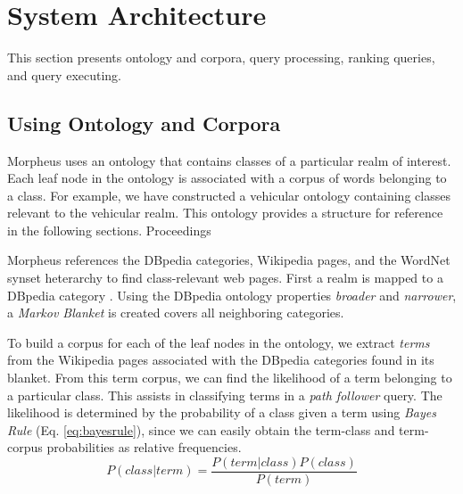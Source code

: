 \section{System Architecture}
\label{sec:systemarch}

This section presents ontology and corpora, query processing, ranking queries, and query executing.

\subsection{Using Ontology and Corpora} 
\label{sec:ontology_corpora}

Morpheus uses an ontology that contains classes of a particular realm of interest. Each leaf node in the ontology is associated with a corpus of words belonging to a class.  For example, we have constructed a vehicular ontology containing classes relevant to the vehicular realm. This ontology provides a structure for reference in the following sections.
Proceedings


Morpheus references the DBpedia categories, Wikipedia pages, and the WordNet synset heterarchy to find class-relevant web pages. First a realm is mapped to a DBpedia category \cite{Bizer2009}. Using the DBpedia ontology properties \emph{broader} and \emph{narrower}, a \emph{Markov Blanket} \cite{PRIS} is created covers all neighboring categories.


To build a corpus for each of the leaf nodes in the ontology, we extract \emph{terms} from the Wikipedia pages associated with the DBpedia categories found in its blanket. From this term corpus, we can find the likelihood of a term belonging to a particular class. This assists in classifying terms in a \emph{path follower} query. The likelihood is determined by the probability of a class given a term using \textit{Bayes Rule} (Eq. \ref{eq:bayesrule}), since we can easily obtain the term-class and term-corpus probabilities as relative frequencies. 
\begin{equation}
\label{eq:bayesrule}
P (class | term) = \frac{P(term | class) P(class)}{P(term)}
\end{equation}    

